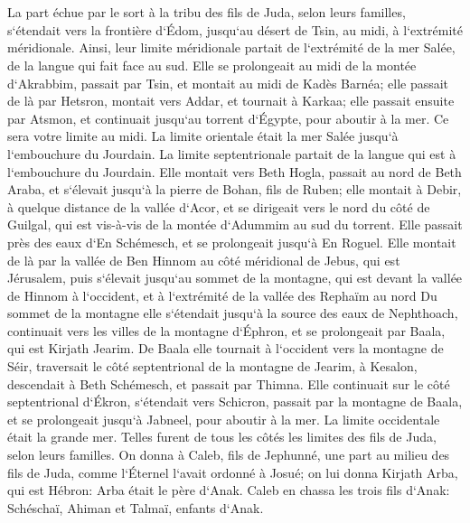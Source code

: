 \chapter{}

\verse La part échue par le sort à la tribu des fils de Juda, selon leurs familles, s`étendait vers la frontière d`Édom, jusqu`au désert de Tsin, au midi, à l`extrémité méridionale. 
\verse Ainsi, leur limite méridionale partait de l`extrémité de la mer Salée, de la langue qui fait face au sud. 
\verse Elle se prolongeait au midi de la montée d`Akrabbim, passait par Tsin, et montait au midi de Kadès Barnéa; elle passait de là par Hetsron, montait vers Addar, et tournait à Karkaa; 
\verse elle passait ensuite par Atsmon, et continuait jusqu`au torrent d`Égypte, pour aboutir à la mer. Ce sera votre limite au midi. 
\verse La limite orientale était la mer Salée jusqu`à l`embouchure du Jourdain. La limite septentrionale partait de la langue qui est à l`embouchure du Jourdain. 
\verse Elle montait vers Beth Hogla, passait au nord de Beth Araba, et s`élevait jusqu`à la pierre de Bohan, fils de Ruben; 
\verse elle montait à Debir, à quelque distance de la vallée d`Acor, et se dirigeait vers le nord du côté de Guilgal, qui est vis-à-vis de la montée d`Adummim au sud du torrent. Elle passait près des eaux d`En Schémesch, et se prolongeait jusqu`à En Roguel. 
\verse Elle montait de là par la vallée de Ben Hinnom au côté méridional de Jebus, qui est Jérusalem, puis s`élevait jusqu`au sommet de la montagne, qui est devant la vallée de Hinnom à l`occident, et à l`extrémité de la vallée des Rephaïm au nord 
\verse Du sommet de la montagne elle s`étendait jusqu`à la source des eaux de Nephthoach, continuait vers les villes de la montagne d`Éphron, et se prolongeait par Baala, qui est Kirjath Jearim. 
\verse De Baala elle tournait à l`occident vers la montagne de Séir, traversait le côté septentrional de la montagne de Jearim, à Kesalon, descendait à Beth Schémesch, et passait par Thimna. 
\verse Elle continuait sur le côté septentrional d`Ékron, s`étendait vers Schicron, passait par la montagne de Baala, et se prolongeait jusqu`à Jabneel, pour aboutir à la mer. 
\verse La limite occidentale était la grande mer. Telles furent de tous les côtés les limites des fils de Juda, selon leurs familles. 
\verse On donna à Caleb, fils de Jephunné, une part au milieu des fils de Juda, comme l`Éternel l`avait ordonné à Josué; on lui donna Kirjath Arba, qui est Hébron: Arba était le père d`Anak. 
\verse Caleb en chassa les trois fils d`Anak: Schéschaï, Ahiman et Talmaï, enfants d`Anak. 
